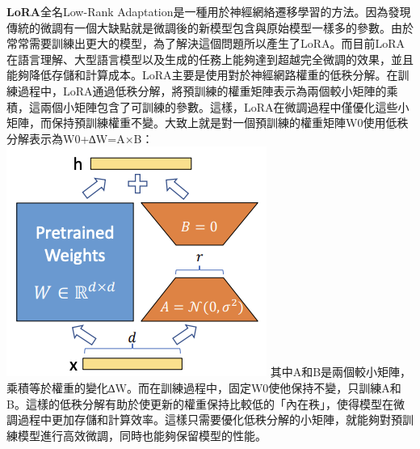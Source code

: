 \documentclass[8pt,a4paper,新細明體,UTF8,natbib]{article}
\begin{document}
\begin{CJK*}{UTF8}{bsmi}
	\textbf{LoRA}全名Low-Rank Adaptation是一種用於神經網絡遷移學習的方法。因為發現傳統的微調有一個大缺點就是微調後的新模型包含與原始模型一樣多的參數。由於常常需要訓練出更大的模型，為了解決這個問題所以產生了LoRA。而目前LoRA在語言理解、大型語言模型以及生成的任務上能夠達到超越完全微調的效果，並且能夠降低存儲和計算成本。LoRA主要是使用對於神經網路權重的低秩分解。在訓練過程中，LoRA通過低秩分解，將預訓練的權重矩陣表示為兩個較小矩陣的乘積，這兩個小矩陣包含了可訓練的參數。這樣，LoRA在微調過程中僅優化這些小矩陣，而保持預訓練權重不變。大致上就是對一個預訓練的權重矩陣W0使用低秩分解表示為W0+∆W=A×B：
	\includegraphics[width=\textwidth]{20120468S5MbIQ5N0s}
	其中A和B是兩個較小矩陣，乘積等於權重的變化∆W。而在訓練過程中，固定W0使他保持不變，只訓練A和B。這樣的低秩分解有助於使更新的權重保持比較低的「內在秩」，使得模型在微調過程中更加存儲和計算效率。這樣只需要優化低秩分解的小矩陣，就能夠對預訓練模型進行高效微調，同時也能夠保留模型的性能。\cite{hu2021lora}


\end{CJK*}
\end{document}
